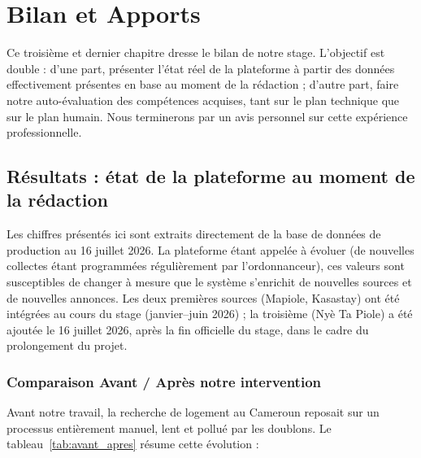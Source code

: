 
\chapter{Bilan et Apports}
\label{chap:bilan_apports}

Ce troisi\`eme et dernier chapitre dresse le bilan de notre stage. L'objectif est double : d'une part, pr\'esenter l'\'etat r\'eel de la plateforme \`a partir des donn\'ees effectivement pr\'esentes en base au moment de la r\'edaction ; d'autre part, faire notre auto-\'evaluation des comp\'etences acquises, tant sur le plan technique que sur le plan humain. Nous terminerons par un avis personnel sur cette exp\'erience professionnelle.

\section{R\'esultats : \'etat de la plateforme au moment de la r\'edaction}
Les chiffres pr\'esent\'es ici sont extraits directement de la base de donn\'ees de production au 16 juillet 2026. La plateforme \'etant appel\'ee \`a \'evoluer (de nouvelles collectes \'etant programm\'ees r\'eguli\`erement par l'ordonnanceur), ces valeurs sont susceptibles de changer \`a mesure que le syst\`eme s'enrichit de nouvelles sources et de nouvelles annonces. Les deux premi\`eres sources (Mapiole, Kasastay) ont \'et\'e int\'egr\'ees au cours du stage (janvier--juin 2026) ; la troisi\`eme (Ny\`e Ta Piole) a \'et\'e ajout\'ee le 16 juillet 2026, apr\`es la fin officielle du stage, dans le cadre du prolongement du projet.

\subsection{Comparaison Avant / Apr\`es notre intervention}
Avant notre travail, la recherche de logement au Cameroun reposait sur un processus enti\`erement manuel, lent et pollu\'e par les doublons. Le tableau~\ref{tab:avant_apres} r\'esume cette \'evolution :

